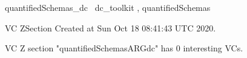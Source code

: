 \documentclass{article}
\begin{document}

\begin{zsection}	 \SECTION quantifiedSchemas\_dc \parents~dc\_toolkit , quantifiedSchemas
\end{zsection}

\newcommand{\appliesTo}{\zbinop{appliesTo}} 
\newcommand{\appliesToNofix}{\zpreop{appliesToNofix}} 

VC ZSection Created at Sun Oct 18 08:41:43 UTC 2020.



 VC Z section "quantifiedSchemasARGdc" has $0$ interesting VCs.



\end{document}
